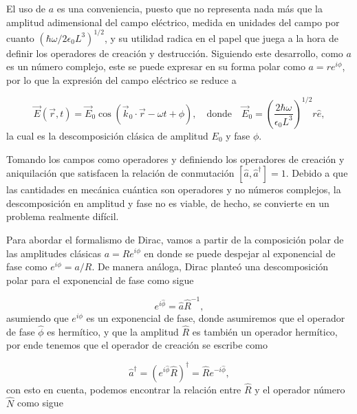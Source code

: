        El uso de $a$ es una conveniencia, puesto que no representa nada más que la amplitud adimensional del campo eléctrico, medida en unidades del campo por cuanto $\left(\hbar\omega/2\epsilon_{0}L^{3}\right)^{1/2}$, y su utilidad radica en el papel que juega a la hora de definir los operadores de creación y destrucción. Siguiendo este desarrollo, como $a$ es un número complejo, este se puede expresar en su forma polar como $a = re^{i\phi}$, por lo que la expresión del campo eléctrico se reduce a 

        \begin{equation}
            \vec{E}(\vec{r},t) = \vec{E}_0 \cos\left( \vec{k}_0\cdot \vec{r} - \omega t + \phi \right),\quad \text{donde} \quad \vec{E}_0 = \left( \frac{2\hbar \omega}{\epsilon_0 L^3} \right)^{1/2}r \hat{e},
        \end{equation}
        la cual es la descomposición clásica de amplitud $E_0$ y fase $\phi$.

        Tomando los campos como operadores y definiendo los operadores de creación y aniquilación que satisfacen la relación de conmutación $\left[ \hat{a}, \hat{a}^\dagger \right] = 1$. Debido a que las cantidades en mecánica cuántica son operadores y no números complejos, la descomposición en amplitud y fase no es viable, de hecho, se convierte en un problema realmente difícil. 

        Para abordar el formalismo de Dirac, vamos a partir de la composición polar de las amplitudes clásicas $a = Re^{i\phi}$ en donde se puede despejar al exponencial de fase como $e^{i\phi} = a/R$. De manera análoga, Dirac planteó una descomposición polar para el exponencial de fase como sigue

        \begin{equation}
            e^{i\hat{\phi}} = \hat{a} \hat{R}^{-1},
        \end{equation}
        asumiendo que $e^{i\phi}$ es un exponencial de fase, donde asumiremos que el operador de fase $\hat{\phi}$ es hermítico, y que la amplitud $\hat{R}$ es también un operador hermítico, por ende tenemos que el operador de creación se escribe como

        \begin{equation}
            \hat{a}^{\dagger} = \left( e^{i\hat{\phi}} \hat{R} \right)^\dagger = \hat{R}e^{-i\hat{\phi}},
        \end{equation}
        con esto en cuenta, podemos encontrar la relación entre $\hat{R}$ y el operador número $\hat{N}$ como sigue

